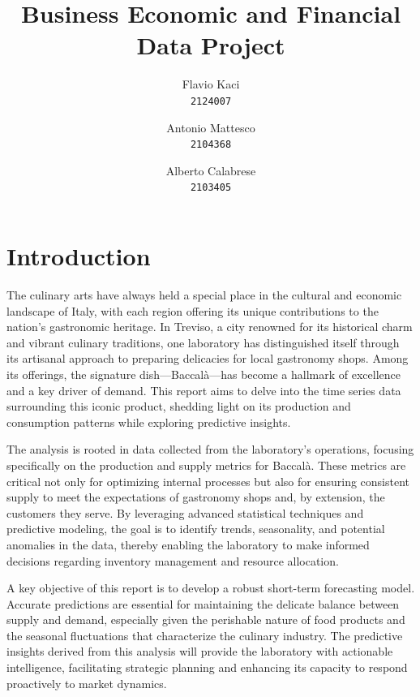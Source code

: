 \documentclass[10pt,twocolumn,letterpaper]{article}
\begin{document}
\title{Business Economic and Financial Data Project}

\author{
Flavio Kaci\\
{\tt\small 2124007}
\and
Antonio Mattesco\\
{\tt\small 2104368}
\and 
Alberto Calabrese\\
{\tt\small 2103405}
}

\date{}
\maketitle


\section{Introduction}
The culinary arts have always held a special place in the cultural and economic landscape of Italy, with each region offering its unique contributions to the nation’s gastronomic heritage. In Treviso, a city renowned for its historical charm and vibrant culinary traditions, one laboratory has distinguished itself through its artisanal approach to preparing delicacies for local gastronomy shops. Among its offerings, the signature dish—Baccalà—has become a hallmark of excellence and a key driver of demand. This report aims to delve into the time series data surrounding this iconic product, shedding light on its production and consumption patterns while exploring predictive insights.

The analysis is rooted in data collected from the laboratory’s operations, focusing specifically on the production and supply metrics for Baccalà. These metrics are critical not only for optimizing internal processes but also for ensuring consistent supply to meet the expectations of gastronomy shops and, by extension, the customers they serve. By leveraging advanced statistical techniques and predictive modeling, the goal is to identify trends, seasonality, and potential anomalies in the data, thereby enabling the laboratory to make informed decisions regarding inventory management and resource allocation.

A key objective of this report is to develop a robust short-term forecasting model. Accurate predictions are essential for maintaining the delicate balance between supply and demand, especially given the perishable nature of food products and the seasonal fluctuations that characterize the culinary industry. The predictive insights derived from this analysis will provide the laboratory with actionable intelligence, facilitating strategic planning and enhancing its capacity to respond proactively to market dynamics.
\end{document}
